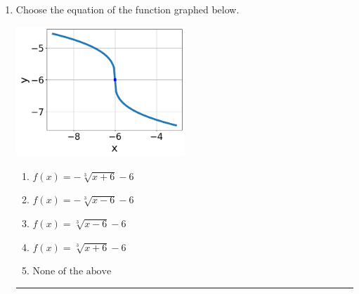 \documentclass[14pt]{extbook}
\newcommand{\litem}[1]{\item#1\hspace*{-1cm}\rule{\textwidth}{0.4pt}}
\begin{document}
\begin{enumerate}
\litem{
Choose the equation of the function graphed below.
\begin{center}
    \includegraphics[width=0.5\textwidth]{../Figures/radicalGraphToEquationB.png}
\end{center}
\begin{enumerate}[label=\Alph*.]
\item \( f(x) = - \sqrt[3]{x + 6} - 6 \)
\item \( f(x) = - \sqrt[3]{x - 6} - 6 \)
\item \( f(x) = \sqrt[3]{x - 6} - 6 \)
\item \( f(x) = \sqrt[3]{x + 6} - 6 \)
\item \( \text{None of the above} \)


\end{enumerate}}
\end{enumerate}
\end{document}
